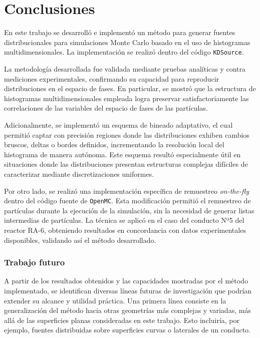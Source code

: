 \chapter{Conclusiones}
\label{chap:conclusiones}

En este trabajo se desarrolló e implementó un método para generar fuentes distribucionales para simulaciones Monte Carlo basado en el uso de histogramas multidimensionales. La implementación se realizó dentro del código \texttt{KDSource}.

La metodología desarrollada fue validada mediante pruebas analíticas y contra mediciones experimentales, confirmando su capacidad para reproducir distribuciones en el espacio de fases. En particular, se mostró que la estructura de histogramas multidimensionales empleada logra preservar satisfactoriamente las correlaciones de las variables del espacio de fases de las partículas.

Adicionalmente, se implementó un esquema de bineado adaptativo, el cual permitió captar con precisión regiones donde las distribuciones exhiben cambios bruscos, deltas o bordes definidos, incrementando la resolución local del histograma de manera autónoma. Este esquema resultó especialmente útil en situaciones donde las distribuciones presentan estructuras complejas difíciles de caracterizar mediante discretizaciones uniformes.

Por otro lado, se realizó una implementación específica de remuestreo \textit{on-the-fly} dentro del código fuente de \texttt{OpenMC}. Esta modificación permitió el remuestreo de partículas durante la ejecución de la simulación, sin la necesidad de generar listas intermedias de partículas. La técnica se aplicó en el caso del conducto Nº5 del reactor RA-6, obteniendo resultados en concordancia con datos experimentales disponibles, validando así el método desarrollado.

\subsection*{Trabajo futuro}

A partir de los resultados obtenidos y las capacidades mostradas por el método implementado, se identifican diversas líneas futuras de investigación que podrían extender su alcance y utilidad práctica. Una primera línea consiste en la generalización del método hacia otras geometrías más complejas y variadas, más allá de las superficies planas consideradas en este trabajo. Esto incluiría, por ejemplo, fuentes distribuidas sobre superficies curvas o laterales de un conducto.

